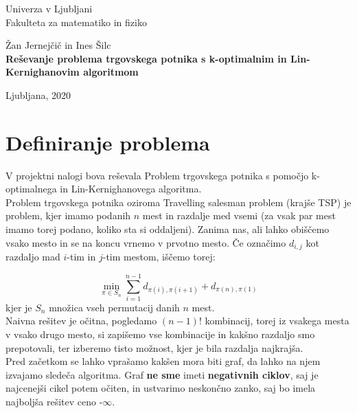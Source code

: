 \documentclass[12pt, a4paper]{article}
\begin{document}
\begin{titlepage}
\begin{center}

\large
Univerza v Ljubljani\\
\normalsize
Fakulteta za matematiko in fiziko\\

\vspace{3 cm} 

\large
Žan Jernejčič in Ines Šilc\\

\vspace{0.5cm}
\LARGE
\textbf{Reševanje problema trgovskega potnika s k-optimalnim in
Lin-Kernighanovim algoritmom}

\vfill

\large Ljubljana, 2020

\end{center}
\end{titlepage}

\newpage

\section[Definiranje problema]{Definiranje problema}

V projektni nalogi bova reševala Problem trgovskega potnika s pomočjo k-optimalnega in Lin-Kernighanovega algoritma.\\

Problem trgovskega potnika oziroma Travelling salesman problem (krajše TSP) je problem, kjer imamo podanih $n$ mest in razdalje med vsemi (za vsak par mest imamo torej podano, koliko sta si oddaljeni). Zanima nas, ali lahko obiščemo vsako mesto in se na koncu vrnemo v prvotno mesto. Če označimo $d_{i, j}$ kot razdaljo mad $i$-tim in $j$-tim mestom, iščemo torej:

$$
\min_{\pi \in S_n} \sum\limits_{i=1}^{n-1} d_{\pi (i), \pi (i+1)} + d_{\pi (n), \pi (1)}
$$
 kjer je $S_n$ množica vseh permutacij danih $n$ mest. \\
 
Naivna rešitev je očitna, pogledamo $(n-1)!$ kombinacij, torej iz vsakega mesta v vsako drugo mesto, si zapišemo vse kombinacije in kakšno razdaljo smo prepotovali, ter izberemo tisto možnost, kjer je bila razdalja najkrajša.\\ 

Pred začetkom se lahko vprašamo kakšen mora biti graf, da lahko na njem izvajamo sledeča algoritma. Graf \textbf{ne sme} imeti \textbf{negativnih ciklov}, saj je najcenejši cikel potem očiten, in ustvarimo neskončno zanko, saj bo imela najboljša rešitev ceno -$\infty$. \\
\end{document}
